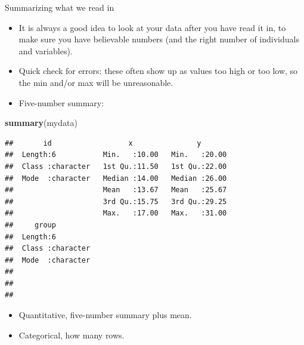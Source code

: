\documentclass[
  ignorenonframetext,
]{beamer}
\newenvironment{Shaded}{\begin{snugshade}}{\end{snugshade}}
\newcommand{\KeywordTok}[1]{\textcolor[rgb]{0.13,0.29,0.53}{\textbf{#1}}}
\newcommand{\NormalTok}[1]{#1}
\providecommand{\tightlist}{%
  \setlength{\itemsep}{0pt}\setlength{\parskip}{0pt}}
\begin{document}
\begin{frame}[fragile]{Summarizing what we read in}
\protect\hypertarget{summarizing-what-we-read-in}{}

\begin{itemize}
\tightlist
\item
  It is always a good idea to look at your data after you have read it
  in, to make sure you have believable numbers (and the right number of
  individuals and variables).
\item
  Quick check for errors: these often show up as values too high or too
  low, so the min and/or max will be unreasonable.
\item
  Five-number summary:
\end{itemize}

\begin{Shaded}
\begin{Highlighting}[]
\KeywordTok{summary}\NormalTok{(mydata)}
\end{Highlighting}
\end{Shaded}

\begin{verbatim}
##       id                  x               y        
##  Length:6           Min.   :10.00   Min.   :20.00  
##  Class :character   1st Qu.:11.50   1st Qu.:22.00  
##  Mode  :character   Median :14.00   Median :26.00  
##                     Mean   :13.67   Mean   :25.67  
##                     3rd Qu.:15.75   3rd Qu.:29.25  
##                     Max.   :17.00   Max.   :31.00  
##     group          
##  Length:6          
##  Class :character  
##  Mode  :character  
##                    
##                    
## 
\end{verbatim}

\begin{itemize}
\tightlist
\item
  Quantitative, five-number summary plus mean.
\item
  Categorical, how many rows.
\end{itemize}

\end{frame}
\end{document}
